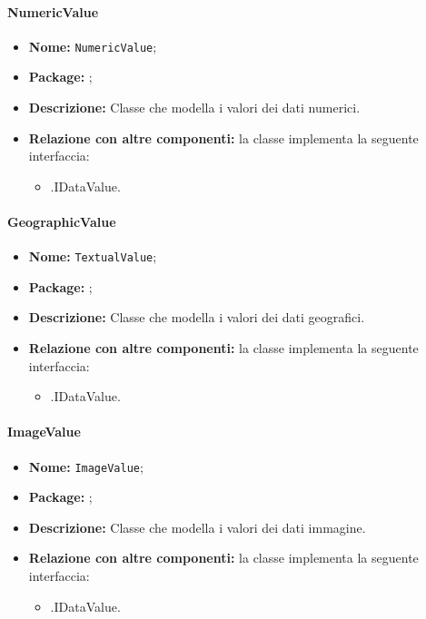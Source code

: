 \paragraph{NumericValue}
\begin{itemize}
\item \textbf{Nome:} \texttt{NumericValue};
\item \textbf{Package:} \texttt{\smodel{}};
\item \textbf{Descrizione:} Classe che modella i valori dei dati numerici.
\item \textbf{Relazione con altre componenti:} la classe implementa la seguente interfaccia:
		\begin{itemize}
			\item \smodel{}.IDataValue.
		\end{itemize}
\end{itemize}

\paragraph{GeographicValue}
\begin{itemize}
\item \textbf{Nome:} \texttt{TextualValue};
\item \textbf{Package:} \texttt{\smodel{}};
\item \textbf{Descrizione:} Classe che modella i valori dei dati geografici.
\item \textbf{Relazione con altre componenti:} la classe implementa la seguente interfaccia:
		\begin{itemize}
			\item \smodel{}.IDataValue.
		\end{itemize}
\end{itemize}

\paragraph{ImageValue}
\begin{itemize}
\item \textbf{Nome:} \texttt{ImageValue};
\item \textbf{Package:} \texttt{\smodel{}};
\item \textbf{Descrizione:} Classe che modella i valori dei dati immagine.
\item \textbf{Relazione con altre componenti:} la classe implementa la seguente interfaccia:
		\begin{itemize}
			\item \smodel{}.IDataValue.
		\end{itemize}
\end{itemize}
